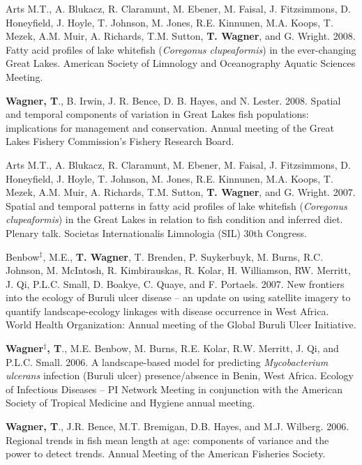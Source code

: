 \documentclass[10pt]{article}
\begin{document}
\begin{flushleft}
\begin{etaremune}
\item Arts M.T., A. Blukacz, R. Claramunt, M. Ebener, M. Faisal, J. Fitzsimmons, D. Honeyfield, J. Hoyle, T. Johnson, M. Jones, R.E. Kinnunen, M.A. Koops, T. Mezek, A.M. Muir, A. Richards, T.M. Sutton, {\bf T. Wagner}, and G. Wright. 2008. Fatty acid profiles of lake whitefish (\emph{Coregonus clupeaformis}) in the ever-changing Great Lakes. American Society of Limnology and Oceanography Aquatic Sciences Meeting.

\item {\bf Wagner, T}., B. Irwin, J. R. Bence, D. B. Hayes, and N. Lester. 2008. Spatial and temporal components of variation in Great Lakes fish populations: implications for management and conservation.  Annual meeting of the Great Lakes Fishery Commission’s Fishery Research Board.


\item Arts M.T., A. Blukacz, R. Claramunt, M. Ebener, M. Faisal, J. Fitzsimmons, D. Honeyfield, J. Hoyle, T. Johnson, M. Jones, R.E. Kinnunen, M.A. Koops, T. Mezek, A.M. Muir, A. Richards, T.M. Sutton, {\bf T. Wagner}, and G. Wright. 2007. Spatial and temporal patterns in fatty acid profiles of lake whitefish (\emph{Coregonus clupeaformis}) in the Great Lakes in relation to fish condition and inferred diet. Plenary talk. Societas Internationalis Limnologia (SIL) 30th Congress. 

\item Benbow$^\ddagger$, M.E., {\bf T. Wagner}, T. Brenden, P. Suykerbuyk, M. Burns, R.C. Johnson, M. McIntosh, R. Kimbirauskas, R. Kolar, H. Williamson, RW. Merritt, J. Qi, P.L.C. Small, D. Boakye, C. Quaye, and F. Portaels. 2007. New frontiers into the ecology of Buruli ulcer disease – an update on using satellite imagery to quantify landscape-ecology linkages with disease occurrence in West Africa. World Health Organization: Annual meeting of the Global Buruli Ulcer Initiative.


\item {\bf Wagner$^\ddagger$, T}., M.E. Benbow, M. Burns, R.E. Kolar, R.W. Merritt, J. Qi, and P.L.C. Small. 2006. A landscape-based model for predicting \emph{Mycobacterium ulcerans} infection (Buruli ulcer) presence/absence in Benin, West Africa. Ecology of Infectious Diseases – PI Network Meeting in conjunction with the American Society of Tropical Medicine and Hygiene annual meeting. 

\item {\bf Wagner, T}., J.R. Bence, M.T. Bremigan, D.B. Hayes, and M.J. Wilberg. 2006. Regional trends in fish mean length at age: components of variance and the power to detect trends. Annual Meeting of the American Fisheries Society. 



\end{etaremune}
\end{flushleft}
\end{document}
